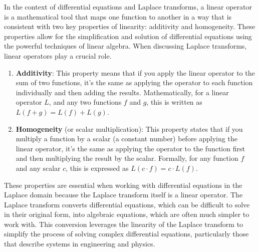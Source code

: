 \documentclass[
  letterpaper,
  DIV=11,
  numbers=noendperiod]{scrreprt}
\theoremstyle{plain}
\theoremstyle{remark}
\begin{document}
\begin{tcolorbox}[enhanced jigsaw, title=\textcolor{quarto-callout-caution-color}{\faFire}\hspace{0.5em}{More about Linear Operators:}, colbacktitle=quarto-callout-caution-color!10!white, opacitybacktitle=0.6, opacityback=0, rightrule=.15mm, breakable, titlerule=0mm, colback=white, bottomtitle=1mm, colframe=quarto-callout-caution-color-frame, toprule=.15mm, leftrule=.75mm, toptitle=1mm, arc=.35mm, bottomrule=.15mm, left=2mm, coltitle=black]

In the context of differential equations and Laplace transforms, a
linear operator is a mathematical tool that maps one function to another
in a way that is consistent with two key properties of linearity:
additivity and homogeneity. These properties allow for the
simplification and solution of differential equations using the powerful
techniques of linear algebra. When discussing Laplace transforms, linear
operators play a crucial role.

\begin{enumerate}
\def\labelenumi{\arabic{enumi}.}
\item
  \textbf{Additivity}: This property means that if you apply the linear
  operator to the sum of two functions, it's the same as applying the
  operator to each function individually and then adding the results.
  Mathematically, for a linear operator \(L\), and any two functions
  \(f\) and \(g\), this is written as \(L(f + g) = L(f) + L(g)\).
\item
  \textbf{Homogeneity} (or scalar multiplication): This property states
  that if you multiply a function by a scalar (a constant number) before
  applying the linear operator, it's the same as applying the operator
  to the function first and then multiplying the result by the scalar.
  Formally, for any function \(f\) and any scalar \(c\), this is
  expressed as \(L(c \cdot f) = c \cdot L(f)\).
\end{enumerate}

These properties are essential when working with differential equations
in the Laplace domain because the Laplace transform itself is a linear
operator. The Laplace transform converts differential equations, which
can be difficult to solve in their original form, into algebraic
equations, which are often much simpler to work with. This conversion
leverages the linearity of the Laplace transform to simplify the process
of solving complex differential equations, particularly those that
describe systems in engineering and physics.


\end{tcolorbox}
\end{document}
